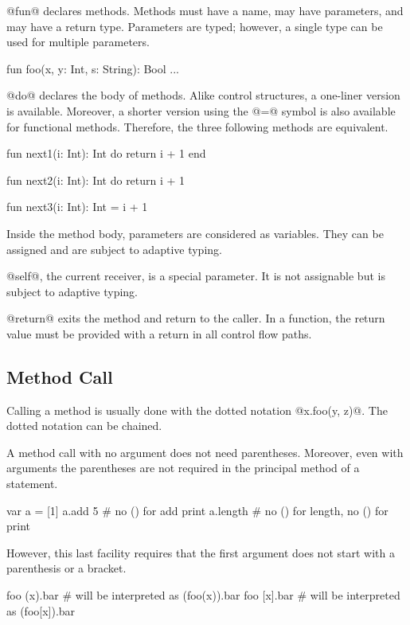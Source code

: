 @fun@ declares methods.
Methods must have a name, may have parameters, and may have a return type.
Parameters are typed; however, a single type can be used for multiple parameters.
\begin{lst}
fun foo(x, y: Int, s: String): Bool ...
\end{lst}

@do@ declares the body of methods.
Alike control structures, a one-liner version is available.
Moreover, a shorter version using the @=@ symbol is also available for functional methods.
Therefore, the three following methods are equivalent. 
\begin{lst}
fun next1(i: Int): Int
do
	return i + 1
end

fun next2(i: Int): Int do return i + 1

fun next3(i: Int): Int = i + 1
\end{lst}

Inside the method body, parameters are considered as variables.
They can be assigned and are subject to adaptive typing.

@self@, the current receiver, is a special parameter.
It is not assignable but is subject to adaptive typing.

@return@ exits the method and return to the caller.
In a function, the return value must be provided with a return in all control flow paths.

\subsection{Method Call}\label{call}

Calling a method is usually done with the dotted notation @x.foo(y, z)@.
The dotted notation can be chained.

A method call with no argument does not need parentheses.
Moreover, even with arguments the parentheses are not required in the principal method of a statement.
\begin{lst}
var a = [1]
a.add 5 # no () for add
print a.length # no () for length, no () for print
\end{lst}

However, this last facility requires that the first argument does not start with a parenthesis or a bracket.
\begin{lst}
foo (x).bar # will be interpreted as (foo(x)).bar
foo [x].bar # will be interpreted as (foo[x]).bar
\end{lst}

